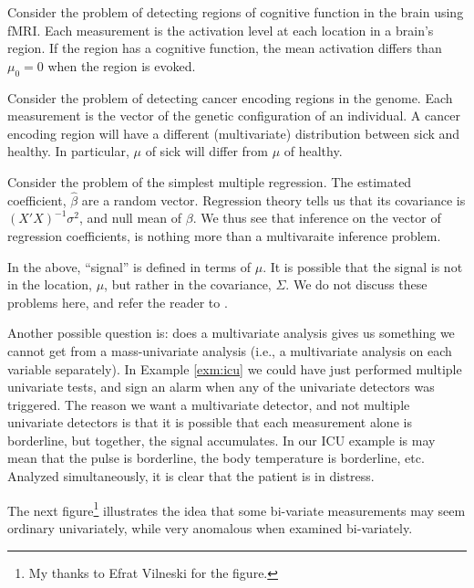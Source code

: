 \documentclass[]{book}
\theoremstyle{definition}
\theoremstyle{definition}
\theoremstyle{definition}
\theoremstyle{remark}
\let\BeginKnitrBlock\begin \let\EndKnitrBlock\end
\begin{document}
\BeginKnitrBlock{example}
\protect\hypertarget{exm:brain-imaging}{}{\label{exm:brain-imaging}
}Consider the problem of detecting regions of cognitive function in the
brain using fMRI. Each measurement is the activation level at each
location in a brain's region. If the region has a cognitive function,
the mean activation differs than \(\mu_0=0\) when the region is evoked.
\EndKnitrBlock{example}

\BeginKnitrBlock{example}
\protect\hypertarget{exm:genetics}{}{\label{exm:genetics} }Consider the
problem of detecting cancer encoding regions in the genome. Each
measurement is the vector of the genetic configuration of an individual.
A cancer encoding region will have a different (multivariate)
distribution between sick and healthy. In particular, \(\mu\) of sick
will differ from \(\mu\) of healthy.
\EndKnitrBlock{example}

\BeginKnitrBlock{example}
\protect\hypertarget{exm:regression}{}{\label{exm:regression} }Consider the
problem of the simplest multiple regression. The estimated coefficient,
\(\hat \beta\) are a random vector. Regression theory tells us that its
covariance is \((X'X)^{-1}\sigma^2\), and null mean of \(\beta\). We
thus see that inference on the vector of regression coefficients, is
nothing more than a multivaraite inference problem.
\EndKnitrBlock{example}

\BeginKnitrBlock{remark}
{}In the above, ``signal'' is defined in terms
of \(\mu\). It is possible that the signal is not in the location,
\(\mu\), but rather in the covariance, \(\Sigma\). We do not discuss
these problems here, and refer the reader to \citet{nadler2008finite}.
\EndKnitrBlock{remark}

Another possible question is: does a multivariate analysis gives us
something we cannot get from a mass-univariate analysis (i.e., a
multivariate analysis on each variable separately). In Example
\ref{exm:icu} we could have just performed multiple univariate tests,
and sign an alarm when any of the univariate detectors was triggered.
The reason we want a multivariate detector, and not multiple univariate
detectors is that it is possible that each measurement alone is
borderline, but together, the signal accumulates. In our ICU example is
may mean that the pulse is borderline, the body temperature is
borderline, etc. Analyzed simultaneously, it is clear that the patient
is in distress.

The next figure\footnote{My thanks to Efrat Vilneski for the figure.}
illustrates the idea that some bi-variate measurements may seem ordinary
univariately, while very anomalous when examined bi-variately.
\end{document}
